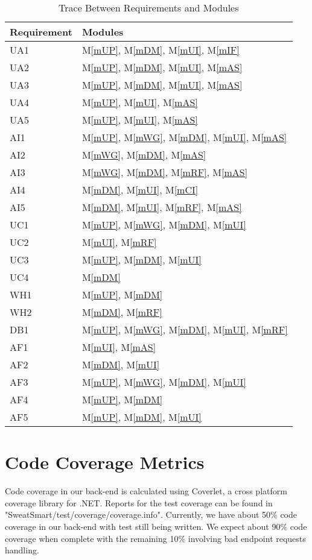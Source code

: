 \documentclass[12pt, titlepage]{article}
\newcommand{\mref}[1]{M\ref{#1}}
\begin{document}
\begin{table}[H]
\centering
\begin{tabular}{p{} p{}}
\toprule
\textbf{Requirement} & \textbf{Modules}\\
\midrule
UA1 & \mref{mUP}, \mref{mDM}, \mref{mUI}, \mref{mIF}\\
UA2 & \mref{mUP}, \mref{mDM}, \mref{mUI}, \mref{mAS}\\
UA3 & \mref{mUP}, \mref{mDM}, \mref{mUI}, \mref{mAS}\\
UA4 & \mref{mUP}, \mref{mUI}, \mref{mAS}\\
UA5 & \mref{mUP}, \mref{mUI}, \mref{mAS}\\
AI1 & \mref{mUP}, \mref{mWG}, \mref{mDM}, \mref{mUI}, \mref{mAS}\\
AI2 & \mref{mWG}, \mref{mDM}, \mref{mAS}\\
AI3 & \mref{mWG}, \mref{mDM}, \mref{mRF}, \mref{mAS}\\
AI4 & \mref{mDM}, \mref{mUI}, \mref{mCI}\\
AI5 & \mref{mDM}, \mref{mUI}, \mref{mRF}, \mref{mAS}\\
UC1 & \mref{mUP}, \mref{mWG}, \mref{mDM}, \mref{mUI}\\
UC2 & \mref{mUI}, \mref{mRF}\\
UC3 & \mref{mUP}, \mref{mDM}, \mref{mUI}\\
UC4 & \mref{mDM}\\
WH1 & \mref{mUP}, \mref{mDM}\\
WH2 & \mref{mDM}, \mref{mRF}\\
DB1 & \mref{mUP}, \mref{mWG}, \mref{mDM}, \mref{mUI}, \mref{mRF}\\
AF1 & \mref{mUI}, \mref{mAS}\\
AF2 & \mref{mDM}, \mref{mUI}\\
AF3 & \mref{mUP}, \mref{mWG}, \mref{mDM}, \mref{mUI} \\
AF4 & \mref{mUP}, \mref{mDM} \\
AF5 & \mref{mUP}, \mref{mDM}, \mref{mUI}\\
\bottomrule
\end{tabular}
\caption{Trace Between Requirements and Modules}
\label{TblRT}
\end{table}

\section{Code Coverage Metrics}
Code coverage in our back-end is calculated using Coverlet, a cross platform coverage library for .NET. Reports for the test coverage can be found in "SweatSmart/test/coverage/coverage.info". Currently, we have about 50\% code coverage in our back-end with test still being written. We expect about 90\% code coverage when complete with the remaining 10\% involving bad endpoint requests handling.
\end{document}
